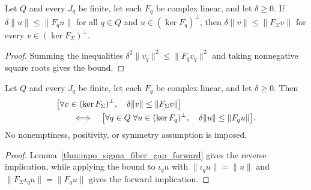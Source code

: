 \begin{lemma}
    \label{thm:mpo_sigma_fiber_gap_forward}
    \leanok
    Let $Q$ and every $J_q$ be finite, let each $F_q$ be complex linear,
    and let $\delta\geq0$.  If $\delta\|u\|\leq\|F_qu\|$ for all $q\in Q$
    and $u\in(\ker F_q)^\perp$, then
    $\delta\|v\|\leq\|F_\Sigma v\|$ for every
    $v\in(\ker F_\Sigma)^\perp$.
\end{lemma}
\begin{proof}
    \leanok
    Summing the inequalities $\delta^2\|v_q\|^2\leq\|F_qv_q\|^2$ and
    taking nonnegative square roots gives the bound.
\end{proof}

\begin{lemma}
    \label{thm:mpo_sigma_fiber_gap_iff}
    \leanok
    Let $Q$ and every $J_q$ be finite, let each $F_q$ be complex linear,
    and let $\delta\geq0$.  Then
    \begin{align}
         & \bigl[\forall v\in(\ker F_\Sigma)^\perp,\quad
        \delta\|v\|\leq\|F_\Sigma v\|\bigr]\notag        \\
         & \qquad\Longleftrightarrow\quad
        \bigl[\forall q\in Q\;\forall u\in(\ker F_q)^\perp,\quad
            \delta\|u\|\leq\|F_qu\|\bigr].
    \end{align}
    No nonemptiness, positivity, or symmetry assumption is imposed.
\end{lemma}
\begin{proof}
    \leanok
    Lemma~\ref{thm:mpo_sigma_fiber_gap_forward} gives the reverse
    implication, while applying the bound to $\iota_qu$ with
    $\|\iota_qu\|=\|u\|$ and $\|F_\Sigma\iota_qu\|=\|F_qu\|$ gives the
    forward implication.
\end{proof}

